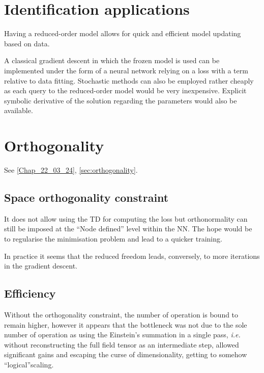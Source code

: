 
\section{Identification applications}

Having a reduced-order model allows for quick and efficient model updating based on data. 

A classical gradient descent in which the frozen model is used can be implemented under the form of a neural network relying on a loss with a term relative to data fitting. Stochastic methods can also be employed rather cheaply as each query to the reduced-order model would be very inexpensive. Explicit symbolic derivative of the solution regarding the parameters would also be available.


\section{Orthogonality}
See \cref{Chap_22_03_24}, \cref{sec:orthogonality}.
\subsection{Space orthogonality constraint}
It does not allow using the TD for computing the loss but orthonormality can still be imposed at the ``Node defined'' level within the NN. The hope would be to regularise the minimisation problem and lead to a quicker training. 

In practice it seems that the reduced freedom leads, conversely, to more iterations in the gradient descent. 


\subsection{Efficiency}

Without the orthogonality constraint, the number of operation is bound to remain higher, however it appears that the bottleneck was not due to the sole number of operation as using the Einstein's summation in a single pass, \emph{i.e.} without reconstructing the full field tensor as an intermediate step, allowed significant gains and escaping the curse of dimensionality, getting to somehow ``logical''scaling.

